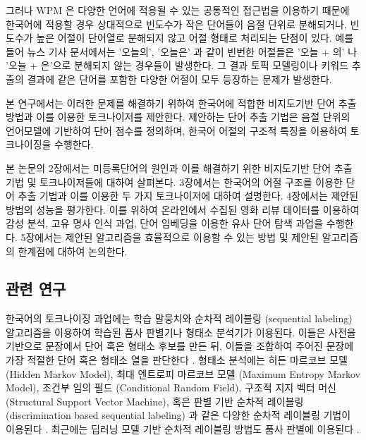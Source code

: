 \documentclass[11pt]{article}
\begin{document}
그러나 WPM 은 다양한 언어에 적용될 수 있는 공통적인 접근법을 이용하기 때문에 한국어에 적용할 경우 상대적으로 빈도수가 작은 단어들이 음절 단위로 분해되거나, 빈도수가 높은 어절이 단어열로 분해되지 않고 어절 형태로 처리되는 단점이 있다.
예를 들어 뉴스 기사 문서에서는 '오늘의', '오늘은' 과 같이 빈번한 어절들은 '오늘 + 의' 나 '오늘 + 은'으로 분해되지 않는 경우들이 발생한다.
그 결과 토픽 모델링이나 키워드 추출의 결과에 같은 단어를 포함한 다양한 어절이 모두 등장하는 문제가 발생한다.

본 연구에서는 이러한 문제를 해결하기 위하여 한국어에 적합한 비지도기반 단어 추출 방법과 이를 이용한 토크나이저를 제안한다.
제안하는 단어 추출 기법은 음절 단위의 언어모델에 기반하여 단어 점수를 정의하며, 한국어 어절의 구조적 특징을 이용하여 토크나이징을 수행한다.

본 논문의 2장에서는 미등록단어의 원인과 이를 해결하기 위한 비지도기반 단어 추출 기법 및 토크나이저들에 대하여 살펴본다.
3장에서는 한국어의 어절 구조를 이용한 단어 추출 기법과 이를 이용한 두 가지 토크나이저에 대하여 설명한다.
4장에서는 제안된 방법의 성능을 평가한다.
이를 위하여 온라인에서 수집된 영화 리뷰 데이터를 이용하여 감성 분석, 고유 명사 인식 과업, 단어 임베딩을 이용한 유사 단어 탐색 과업을 수행한다.
5장에서는 제안된 알고리즘을 효율적으로 이용할 수 있는 방법 및 제안된 알고리즘의 한계점에 대하여 논의한다.

\subsection{관련 연구}

한국어의 토크나이징 과업에는 학습 말뭉치와 순차적 레이블링 (sequential labeling) 알고리즘을 이용하여 학습된 품사 판별기나 형태소 분석기가 이용된다. \citep{konlpy,shim2007made}
이들은 사전을 기반으로 문장에서 단어 혹은 형태소 후보를 만든 뒤, 이들을 조합하여 주어진 문장에 가장 적절한 단어 혹은 형태소 열을 판단한다 \citep{brants2000tnt}.
형태소 분석에는 히든 마르코브 모델 (Hidden Markov Model), 최대 엔트로피 마르코브 모델 (Maximum Entropy Markov Model),  조건부 임의 필드 (Conditional Random Field), 구조적 지지 벡터 머신 (Structural Support Vector Machine), 혹은 판별 기반 순차적 레이블링 (discrimination based sequential labeling) 과 같은 다양한 순차적 레이블링 기법이 이용된다 \citep{krogh1994hidden, mccallum2000maximum, kudo2004applying, taskar2004max, tsochantaridis2005large, bohnet2012transition, na2012crfs}.
최근에는 딥러닝 모델 기반 순차적 레이블링 방법도 품사 판별에 이용된다 \citep{zheng2013deep, collobert2011natural}.
\end{document}
